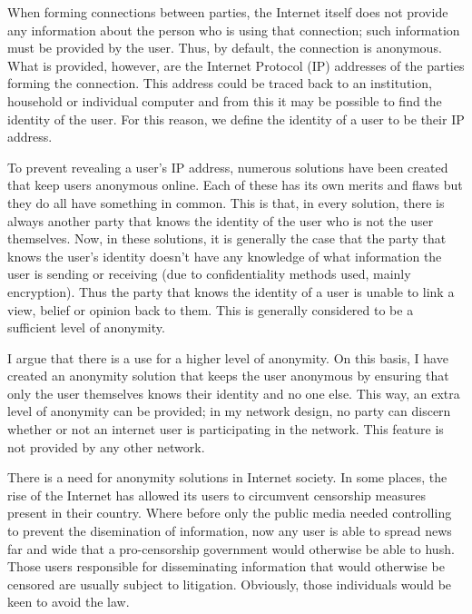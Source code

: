 \documentclass[ %
                    author={Luke Murray},
                supervisor={Dr. Simon Hollis},
                     title={Shadow Peer-to-Peer Networks},
                  subtitle={},
                    degree={MEng},
                      year={2013} ]{thesis}
\begin{document}
When forming connections between parties, the Internet itself does not provide any information about the person who is using that connection; such information must be provided by the user. Thus, by default, the connection is anonymous. What is provided, however, are the Internet Protocol (IP) addresses of the parties forming the connection. This address could be traced back to an institution, household or individual computer and from this it may be possible to find the identity of the user. For this reason, we define the identity of a user to be their IP address. 

To prevent revealing a user's IP address, numerous solutions have been created that keep users anonymous online. Each of these has its own merits and flaws but they do all have something in common. This is that, in every solution, there is always another party that knows the identity of the user who is not the user themselves. Now, in these solutions, it is generally the case that the party that knows the user's identity doesn't have any knowledge of what information the user is sending or receiving (due to confidentiality methods used, mainly encryption). Thus the party that knows the identity of a user is unable to link a view, belief or opinion back to them. This is generally considered to be a sufficient level of anonymity.

I argue that there is a use for a higher level of anonymity. On this basis, I have created an anonymity solution that keeps the user anonymous by ensuring that only the user themselves knows their identity and no one else. This way, an extra level of anonymity can be provided; in my network design, no party can discern whether or not an internet user is participating in the network. This feature is not provided by any other network.



There is a need for anonymity solutions in Internet society. In some places, the rise of the Internet has allowed its users to circumvent censorship measures present in their country. Where before only the public media needed controlling to prevent the disemination of information, now any user is able to spread news far and wide that a pro-censorship government would otherwise be able to hush. Those users responsible for disseminating information that would otherwise be censored are usually subject to litigation. Obviously, those individuals would be keen to avoid the law.
\end{document}

